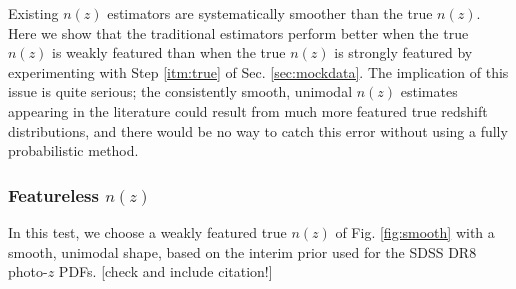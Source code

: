\documentclass[iop]{emulateapj}
\begin{document}
Existing $n(z)$ estimators are systematically smoother than the true $n(z)$.  
Here we show that the traditional estimators perform better when the true 
$n(z)$ is weakly featured than when the true $n(z)$ is strongly featured by 
experimenting with Step \ref{itm:true} of Sec. \ref{sec:mockdata}.  The 
implication of this issue is quite serious; the consistently smooth, unimodal 
$n(z)$ estimates appearing in the literature could result from much more 
featured true redshift distributions, and there would be no way to catch this 
error without using a fully probabilistic method.

\subsubsection{Featureless $n(z)$}
\label{sec:smooth}

In this test, we choose a weakly featured true $n(z)$ of Fig. \ref{fig:smooth} 
with a smooth, unimodal shape, based on the interim prior used for the SDSS DR8 
photo-$z$ PDFs.  [check and include citation!]
\end{document}
